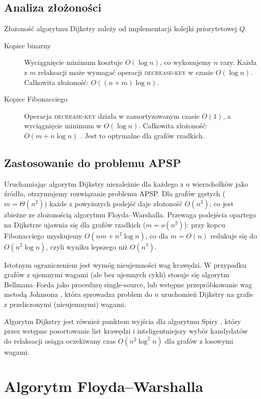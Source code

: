 \subsection{Analiza złożoności}

Złożoność algorytmu Dijkstry zależy od implementacji kolejki
priorytetowej $Q$.

\begin{description}
\item[Kopiec binarny] Wyciągnięcie minimum kosztuje $O(\log n)$,
co wykonujemy $n$ razy. Każda z $m$ relaksacji może wymagać
operacji \textsc{decrease-key} w czasie $O(\log n)$. Całkowita
złożoność: $O((n + m)\log n)$.

\item[Kopiec Fibonacciego] Operacja \textsc{decrease-key} działa
w zamortyzowanym czasie $O(1)$, a wyciągnięcie minimum w $O(\log n)$.
Całkowita złożoność: $O(m + n\log n)$ \cite{FredmanTarjan1984}.
Jest to optymalne dla grafów rzadkich.
\end{description}

\subsection{Zastosowanie do problemu APSP}
Uruchamiając algorytm Dijkstry niezależnie dla każdego z $n$
wierzchołków jako źródła, otrzymujemy rozwiązanie problemu APSP.
Dla grafów gęstych ($m = \Theta(n^2)$) każde z powyższych podejść
daje złożoność $O(n^3)$, co jest zbieżne ze złożonością algorytmu
Floyda--Warshalla. Przewaga podejścia opartego na Dijkstrze ujawnia
się dla grafów rzadkich ($m = o(n^2)$): przy kopcu Fibonacciego
uzyskujemy $O(nm + n^2\log n)$, co dla $m = O(n)$ redukuje się do
$O(n^2\log n)$, czyli wyniku lepszego niż $O(n^3)$.

Istotnym ograniczeniem jest wymóg nieujemności wag krawędzi.
W przypadku grafów z ujemnymi wagami (ale bez ujemnych cykli)
stosuje się algorytm Bellmana--Forda \cite{Bellman1958} jako procedurę
single-source, lub wstępne przepróbkowanie wag metodą Johnsona
\cite{Johnson1977}, która sprowadza problem do $n$ uruchomień Dijkstry
na grafie z przeliczonymi (nieujemnymi) wagami.

Algorytm Dijkstry jest również punktem wyjścia dla algorytmu
Spiry \cite{Spira1973}, który przez wstępne posortowanie list
krawędzi i inteligentniejszy wybór kandydatów do relaksacji
osiąga oczekiwany czas $O(n^2\log^2 n)$ dla grafów z losowymi
wagami.
 
\section{Algorytm Floyda--Warshalla}
 
